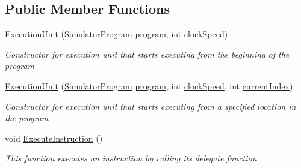 \subsection*{Public Member Functions}
\begin{DoxyCompactItemize}
\item 
\hyperlink{class_c_p_u___o_s___simulator_1_1_c_p_u_1_1_execution_unit_aaa72bccee27d810d5bbfa9ed02215fa9}{Execution\+Unit} (\hyperlink{class_c_p_u___o_s___simulator_1_1_c_p_u_1_1_simulator_program}{Simulator\+Program} \hyperlink{class_c_p_u___o_s___simulator_1_1_c_p_u_1_1_execution_unit_a192670bee8ca089c38e9989350f658d6}{program}, int \hyperlink{class_c_p_u___o_s___simulator_1_1_c_p_u_1_1_execution_unit_a0deb0a3e0c9fa402598bbf18be6535cc}{clock\+Speed})
\begin{DoxyCompactList}\small\item\em Constructor for execution unit that starts executing from the beginning of the program \end{DoxyCompactList}\item 
\hyperlink{class_c_p_u___o_s___simulator_1_1_c_p_u_1_1_execution_unit_a0b69abfef40692e266fee90b2321797e}{Execution\+Unit} (\hyperlink{class_c_p_u___o_s___simulator_1_1_c_p_u_1_1_simulator_program}{Simulator\+Program} \hyperlink{class_c_p_u___o_s___simulator_1_1_c_p_u_1_1_execution_unit_a192670bee8ca089c38e9989350f658d6}{program}, int \hyperlink{class_c_p_u___o_s___simulator_1_1_c_p_u_1_1_execution_unit_a0deb0a3e0c9fa402598bbf18be6535cc}{clock\+Speed}, int \hyperlink{class_c_p_u___o_s___simulator_1_1_c_p_u_1_1_execution_unit_af6807cb5343acc2c40a08166c748f1f0}{current\+Index})
\begin{DoxyCompactList}\small\item\em Constructor for execution unit that starts executing from a specified location in the program \end{DoxyCompactList}\item 
void \hyperlink{class_c_p_u___o_s___simulator_1_1_c_p_u_1_1_execution_unit_ae0298423e5e7aad47e342e3960a361ac}{Execute\+Instruction} ()
\begin{DoxyCompactList}\small\item\em This function executes an instruction by calling its delegate function \end{DoxyCompactList}\end{DoxyCompactItemize}
